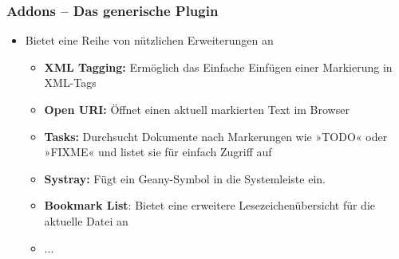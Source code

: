 \begin{frame}
    \frametitle{Addons -- Das generische Plugin}
    \begin{block}{}
        \begin{itemize}
            \item Bietet eine Reihe von nützlichen Erweiterungen an
            \begin{itemize}
                \item \textbf{XML Tagging:} Ermöglich das Einfache Einfügen
                      einer Markierung in XML-Tags
                \item \textbf{Open URI:} Öffnet einen aktuell markierten
                      Text im Browser
                \item \textbf{Tasks:} Durchsucht Dokumente nach Markerungen
                      wie »TODO« oder »FIXME« und listet sie für einfach
                      Zugriff auf
                \item \textbf{Systray:} Fügt ein Geany-Symbol in die
                      Systemleiste ein.
                \item \textbf{Bookmark List}: Bietet eine erweitere
                      Lesezeichenübersicht für die aktuelle Datei an
                \item ...
            \end{itemize}
        \end{itemize}
    \end{block}
\end{frame}
